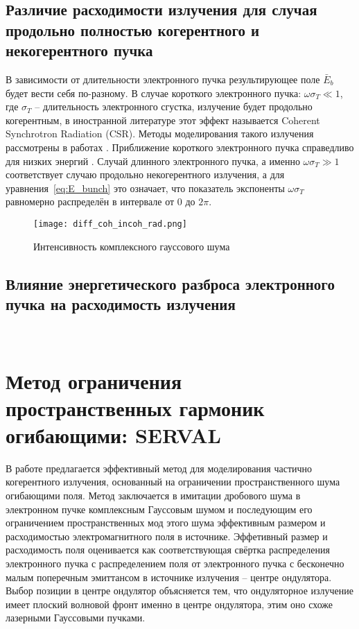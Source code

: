 \subsection{Различие расходимости излучения для случая продольно полностью когерентного и некогерентного пучка}
В зависимости от длительности электронного пучка результирующее поле $\bar{E}_{b}$ будет вести себя по-разному. В случае короткого электронного пучка: $\omega \sigma_T \ll 1$, где $\sigma_T$ -- длительность электронного сгустка, излучение будет продольно когерентным, в иностранной литературе этот эффект называется Coherent Synchrotron Radiation (CSR). Методы моделирования такого излучения рассмотрены в работах . Приближение короткого электронного пучка справедливо для низких энергий . Случай длинного электронного пучка, а именно  $\omega \sigma_T \gg 1$ соответствует случаю продольно некогерентного излучения, а для уравнения~\ref{eq:E_bunch} это означает, что показатель экспоненты $\omega \sigma_T$ равномерно распределён в интервале от $0$ до $2 \pi$. 


\begin{figure}[H] 
	\centering 	\texttt{[image: diff\_coh\_incoh\_rad.png]}
	\caption{Интенсивность комплексного гауссового шума}
	\label{fig:diff_coh_incoh_rad}
\end{figure}
\subsection{Влияние энергетического разброса электронного пучка на расходимость излучения}
\\
\section{Метод ограничения пространственных гармоник огибающими: SERVAL}
В работе предлагается эффективный метод для моделирования частично когерентного излучения, основанный на ограничении пространственного шума огибающими поля. Метод заключается в имитации дробового шума в электронном пучке комплексным Гауссовым шумом и последующим его ограничением пространственных мод этого шума эффективным размером и расходимостью электромагнитного поля в источнике. Эффетивный размер и расходимость поля оценивается как соответствующая свёртка распределения электронного пучка с распределением поля от электронного пучка с бесконечно малым поперечным эмиттансом в источнике излучения -- центре ондулятора. Выбор позиции в центре ондулятор объясняется тем, что ондуляторное излучение имеет плоский волновой фронт именно в центре ондулятора, этим оно схоже лазерными Гауссовыми пучками.

